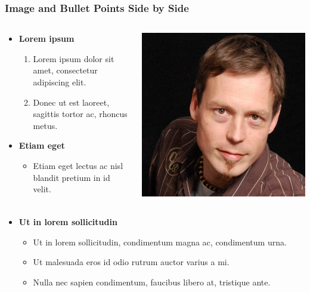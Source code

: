 \documentclass[english]{beamer}
\begin{document}
\begin{frame}
\frametitle{Image and Bullet Points Side by Side}
\begin{columns}
\begin{column}{.66\textwidth}
\begin{itemize}
\item \textbf{Lorem ipsum} 
\begin{enumerate}
\item Lorem ipsum dolor sit amet, consectetur adipiscing elit.
\item Donec ut est laoreet, sagittis tortor ac, rhoncus metus.
\end{enumerate}
\item \textbf{Etiam eget} 
\begin{itemize}
\item Etiam eget lectus ac nisl blandit pretium in id velit.
\end{itemize}
\end{itemize}
\end{column}

\begin{column}{.3\textwidth}
\includegraphics[width=\textwidth]{me}
\end{column}
\end{columns}

\vspace{-.7mm}
\begin{itemize}
\item \textbf{Ut in lorem sollicitudin}
\begin{itemize}
\item Ut in lorem sollicitudin, condimentum magna ac, condimentum urna.
\item Ut malesuada eros id odio rutrum auctor varius a mi.
\item Nulla nec sapien condimentum, faucibus libero at, tristique ante.
\end{itemize}
\end{itemize}
\end{frame}
\end{document}
